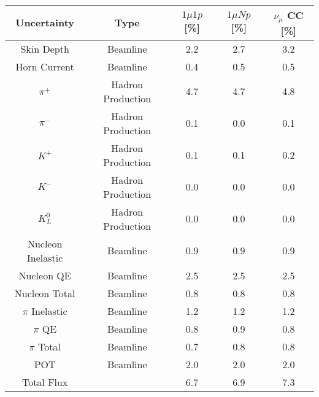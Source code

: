 \begin{tabular}{ccccc}
\toprule
Uncertainty & Type & $1\mu1p$ [\%] & $1\mu Np$ [\%] & $\nu_\mu$ CC [\%] \\
\midrule
Skin Depth & Beamline & 2.2 & 2.7 & 3.2 \\
Horn Current & Beamline & 0.4 & 0.5 & 0.5 \\
$\pi^+$ & Hadron Production & 4.7 & 4.7 & 4.8 \\
$\pi^-$ & Hadron Production & 0.1 & 0.0 & 0.1 \\
$K^+$ & Hadron Production & 0.1 & 0.1 & 0.2 \\
$K^-$ & Hadron Production & 0.0 & 0.0 & 0.0 \\
$K^0_L$ & Hadron Production & 0.0 & 0.0 & 0.0 \\
Nucleon Inelastic & Beamline & 0.9 & 0.9 & 0.9 \\
Nucleon QE & Beamline & 2.5 & 2.5 & 2.5 \\
Nucleon Total & Beamline & 0.8 & 0.8 & 0.8 \\
$\pi$ Inelastic & Beamline & 1.2 & 1.2 & 1.2 \\
$\pi$ QE & Beamline & 0.8 & 0.9 & 0.8 \\
$\pi$ Total & Beamline & 0.7 & 0.8 & 0.8 \\
POT & Beamline & 2.0 & 2.0 & 2.0 \\
\midrule
Total Flux &  & 6.7 & 6.9 & 7.3 \\
\bottomrule
\end{tabular}